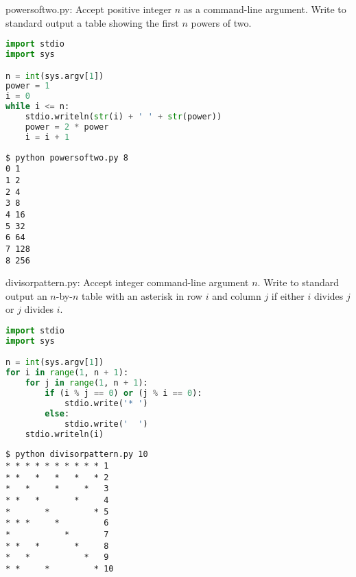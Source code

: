 \documentclass[8pt,a4paper,compress,handout]{beamer}
\begin{document}
\begin{frame}[fragile]
\begin{framed}
\tiny powersoftwo.py: Accept positive integer $n$ as a command-line argument. Write to standard output a table showing the first $n$ powers of two.
\end{framed}

\begin{lstlisting}[language=Python]
import stdio
import sys

n = int(sys.argv[1])
power = 1
i = 0
while i <= n:
    stdio.writeln(str(i) + ' ' + str(power))    
    power = 2 * power
    i = i + 1
\end{lstlisting}

\begin{lstlisting}[language={}]
$ python powersoftwo.py 8
0 1
1 2
2 4
3 8
4 16
5 32
6 64
7 128
8 256
\end{lstlisting}
\end{frame}

\begin{frame}[fragile]
\begin{framed}
\tiny divisorpattern.py: Accept integer command-line argument $n$. Write to standard output an $n$-by-$n$ table with an asterisk in row $i$ and column $j$ if either $i$ divides $j$ or $j$ divides $i$.
\end{framed}

\begin{lstlisting}[language=Python]
import stdio
import sys

n = int(sys.argv[1])
for i in range(1, n + 1):
    for j in range(1, n + 1):
        if (i % j == 0) or (j % i == 0):
            stdio.write('* ')
        else:
            stdio.write('  ')
    stdio.writeln(i)
\end{lstlisting}

\begin{lstlisting}[language={}]
$ python divisorpattern.py 10
* * * * * * * * * * 1
* *   *   *   *   * 2
*   *     *     *   3
* *   *       *     4
*       *         * 5
* * *     *         6
*           *       7
* *   *       *     8
*   *           *   9
* *     *         * 10
\end{lstlisting}
\end{frame}
\end{document}
